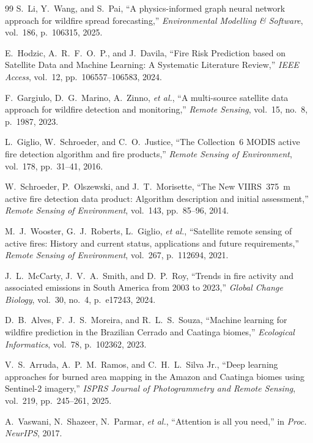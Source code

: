 \documentclass[preprint,times,numbers]{elsarticle}
\begin{document}
\begin{thebibliography}{99}
S.~Li, Y.~Wang, and S.~Pai, ``A physics-informed graph neural network approach for wildfire spread forecasting,'' \textit{Environmental Modelling \& Software}, vol.~186, p.~106315, 2025.

E.~Hodzic, A.~R.~F.~O.~P., and J.~Davila, ``Fire Risk Prediction based on Satellite Data and Machine Learning: A Systematic Literature Review,'' \textit{IEEE Access}, vol.~12, pp.~106557--106583, 2024.

F.~Gargiulo, D.~G.~Marino, A.~Zinno, \emph{et al.}, ``A multi-source satellite data approach for wildfire detection and monitoring,'' \textit{Remote Sensing}, vol.~15, no.~8, p.~1987, 2023.

L.~Giglio, W.~Schroeder, and C.~O.~Justice, ``The Collection~6 MODIS active fire detection algorithm and fire products,'' \textit{Remote Sensing of Environment}, vol.~178, pp.~31--41, 2016.

W.~Schroeder, P.~Olszewski, and J.~T.~Morisette, ``The New VIIRS~375~m active fire detection data product: Algorithm description and initial assessment,'' \textit{Remote Sensing of Environment}, vol.~143, pp.~85--96, 2014.

M.~J.~Wooster, G.~J.~Roberts, L.~Giglio, \emph{et al.}, ``Satellite remote sensing of active fires: History and current status, applications and future requirements,'' \textit{Remote Sensing of Environment}, vol.~267, p.~112694, 2021.

J.~L.~McCarty, J.~V.~A.~Smith, and D.~P.~Roy, ``Trends in fire activity and associated emissions in South America from 2003 to 2023,'' \textit{Global Change Biology}, vol.~30, no.~4, p.~e17243, 2024.

D.~B.~Alves, F.~J.~S.~Moreira, and R.~L.~S.~Souza, ``Machine learning for wildfire prediction in the Brazilian Cerrado and Caatinga biomes,'' \textit{Ecological Informatics}, vol.~78, p.~102362, 2023.

V.~S.~Arruda, A.~P.~M.~Ramos, and C.~H.~L.~Silva Jr., ``Deep learning approaches for burned area mapping in the Amazon and Caatinga biomes using Sentinel-2 imagery,'' \textit{ISPRS Journal of Photogrammetry and Remote Sensing}, vol.~219, pp.~245--261, 2025.

A.~Vaswani, N.~Shazeer, N.~Parmar, \emph{et al.}, ``Attention is all you need,'' in \textit{Proc. NeurIPS}, 2017.


\end{thebibliography}
\end{document}

